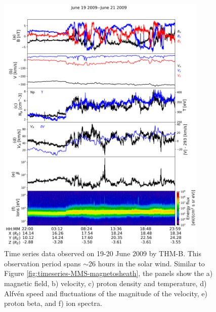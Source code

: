 \begin{figure}
    \centering
    \includegraphics[width=0.9\textwidth]{Figures/Time series/timeseries_19062009_THMB.png}
    \caption[Time series data observed in the solar wind during 19-20 June 2009]{Time series data observed on 19-20 June 2009 by THM-B. This observation period spans $\sim$26 hours in the solar wind. Similar to Figure \ref{fig:timeseries-MMS-magnetosheath}, the panels show the a) magnetic field, b) velocity, c) proton density and temperature, d) Alfv\'en speed and fluctuations of the magnitude of the velocity, e) proton beta, and f) ion spectra.}
    \label{fig:timeseries-THM-solarwind}
\end{figure}

